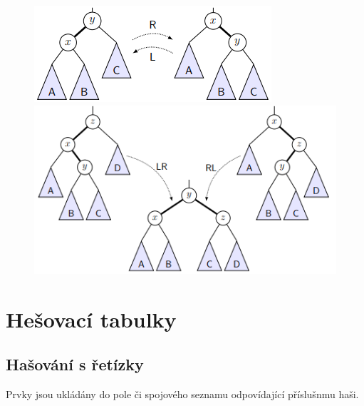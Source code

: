 \documentclass{szzclass}
\begin{document}

\begin{figure}[!h]
	\centering
	\begin{minipage}{0.39\textwidth}
		\centering
        \includegraphics[width=\textwidth]{topics/bi-spol-5/images/avl1.PNG}
	\end{minipage}
	\begin{minipage}{0.59\textwidth}
		\centering
        \includegraphics[width=\textwidth]{topics/bi-spol-5/images/avl2.PNG}
	\end{minipage}
\end{figure}

\newpage


\section{Hešovací tabulky}

\subsection{Hašování s řetízky}
Prvky jsou ukládány do pole či spojového seznamu odpovídající příslušnmu haši.
\end{document}
